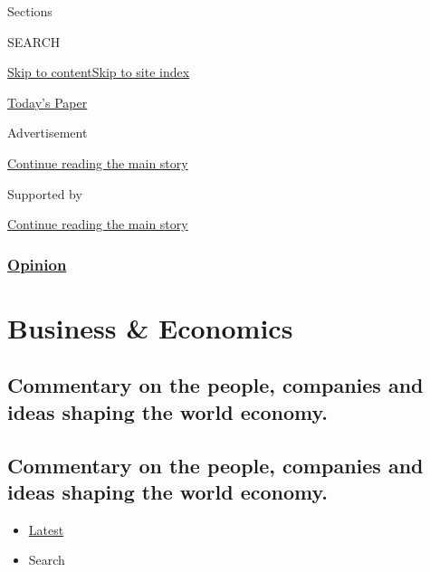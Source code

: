 Sections

SEARCH

\protect\hyperlink{site-content}{Skip to
content}\protect\hyperlink{site-index}{Skip to site index}

\href{https://myaccount.nytimes.com/auth/login?response_type=cookie\&client_id=vi}{}

\href{https://www.nytimes.com/section/todayspaper}{Today's Paper}

Advertisement

\protect\hyperlink{after-top}{Continue reading the main story}

Supported by

\protect\hyperlink{after-sponsor}{Continue reading the main story}

\hypertarget{opinion}{%
\subsubsection{\texorpdfstring{\href{/section/opinion}{Opinion}}{Opinion}}\label{opinion}}

\hypertarget{business--economics}{%
\section{Business \& Economics}\label{business--economics}}

\hypertarget{commentary-on-the-people-companies-and-ideas-shaping-the-world-economy}{%
\subsection{Commentary on the people, companies and ideas shaping the
world
economy.}\label{commentary-on-the-people-companies-and-ideas-shaping-the-world-economy}}

\hypertarget{commentary-on-the-people-companies-and-ideas-shaping-the-world-economy-1}{%
\subsection{Commentary on the people, companies and ideas shaping the
world
economy.}\label{commentary-on-the-people-companies-and-ideas-shaping-the-world-economy-1}}

\begin{itemize}
\tightlist
\item
  \protect\hyperlink{stream-panel}{Latest}
\item
  Search
\end{itemize}

